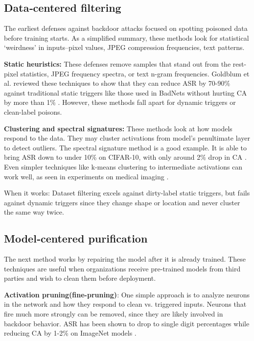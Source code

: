 \documentclass[sigconf,authorversion,nonacm,balance=false]{acmart}
\begin{document}
\subsection{Data‑centered filtering}
\label{sec:datafilter}

The earliest defenses against backdoor attacks focused on spotting poisoned data before training starts. As a simplified summary, these methods look for statistical `weirdness’ in inputs–pixel values, JPEG compression frequencies, text patterns. 

\textbf{Static heuristics:} These defenses remove samples that stand out from the rest-pixel statistics, JPEG frequency spectra, or text n-gram frequencies. Goldblum et al. reviewed these techniques to show that they can reduce ASR by 70-90\% against traditional static triggers like those used in BadNets without hurting CA by more than 1\% \cite{background_attack_defense_goldblum_2023}. However, these methods fall apart for dynamic triggers or clean-label poisons. 

\textbf{Clustering and spectral signatures:} These methods look at how models respond to the data. They may cluster activations from model's penultimate layer to detect outliers. The spectral signature method is a good example. It is able to bring ASR down to under 10\% on CIFAR-10, with only around 2\% drop in CA \cite{attack_defense_wang_2023}. Even simpler techniques like k-means clustering to intermediate activations can work well, as seen in experiments on medical imaging \cite{defense_shamshiri_2024}.

When it works: Dataset filtering excels against dirty-label static triggers, but fails against dynamic triggers since they change shape or location and never cluster the same way twice.

\subsection{Model‑centered purification}
The next method works by repairing the model after it is already trained. These techniques are useful when organizations receive pre-trained models from third parties and wish to clean them before deployment. 

\textbf{Activation pruning(fine-pruning)}: One simple approach is to analyze neurons in the network and how they respond to clean vs. triggered inputs. Neurons that fire much more strongly can be removed, since they are likely involved in backdoor behavior. ASR has been shown to drop to single digit percentages while reducing CA by 1-2\% on ImageNet models \cite{background_attack_defense_cina_2024}. 
\end{document}
